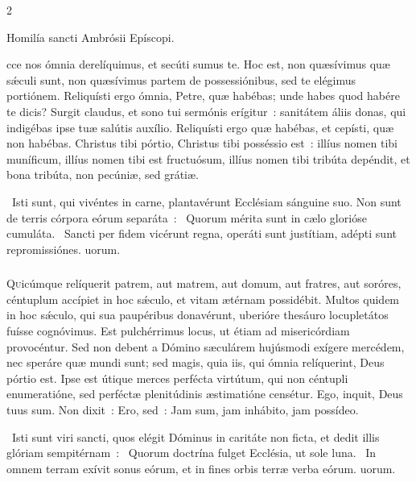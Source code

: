 \documentclass[9pt,twoside]{extarticle}
\begin{document}
\begin{multicols}{2}
{\begin{center}Homilía sancti Ambrósii Epíscopi.\\
\end{center}
cce nos ómnia derelíquimus, et secúti sumus te. Hoc est, non quæsívimus quæ sǽculi sunt, non quæsívimus partem de possessiónibus, sed te elégimus portiónem. Reliquísti ergo ómnia, Petre, quæ habébas; unde habes quod habére te dicis? Surgit claudus, et sono tui sermónis erígitur~: sanitátem áliis donas, qui indigébas ipse tuæ salútis auxílio. Reliquísti ergo quæ habébas, et cepísti, quæ non habébas. Christus tibi pórtio, Christus tibi posséssio est~: illíus nomen tibi muníficum, illíus nomen tibi est fructuósum, illíus nomen tibi tribúta depéndit, et bona tribúta, non pecúniæ, sed grátiæ.

\begin{tightlist}{}
\item {}~Isti sunt, qui vivéntes in carne, plantavérunt Ecclésiam sánguine suo. Non sunt de terris córpora eórum separáta~: \textred{*}~Quorum mérita sunt in cælo glorióse cumuláta. ~Sancti per fidem vicérunt regna, operáti sunt justítiam, adépti sunt repromissiónes. uorum.
\end{tightlist}

\subsubsection*{\center {}}
\lettrine{Q}uicúmque relíquerit patrem, aut matrem, aut domum, aut fratres, aut soróres, céntuplum accípiet in hoc sǽculo, et vitam ætérnam possidébit. Multos quidem in hoc sǽculo, qui sua paupéribus donavérunt, uberióre thesáuro locupletátos fuísse cognóvimus. Est pulchérrimus locus, ut étiam ad misericórdiam provocéntur. Sed non debent a Dómino sæculárem hujúsmodi exígere mercédem, nec speráre quæ mundi sunt; sed magis, quia iis, qui ómnia relíquerint, Deus pórtio est. Ipse est útique merces perfécta virtútum, qui non céntupli enumeratióne, sed perféctæ plenitúdinis æstimatióne censétur. Ego, inquit, Deus tuus sum. Non dixit~: Ero, sed~: Jam sum, jam inhábito, jam possídeo.

\begin{tightlist}{}
\item {}~Isti sunt viri sancti, quos elégit Dóminus in caritáte non ficta, et dedit illis glóriam sempitérnam~: \textred{*}~Quorum doctrína fulget Ecclésia, ut sole luna. ~In omnem terram exívit sonus eórum, et in fines orbis terræ verba eórum. uorum.
\end{tightlist}

}
\end{multicols}
\end{document}
